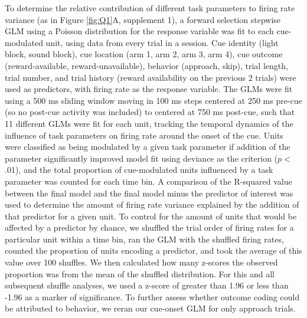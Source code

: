 \documentclass[11pt]{article}
\begin{document}
To determine the relative contribution of different task parameters to firing rate variance (as in Figure \ref{fig:Q1}A, supplement 1), a forward selection stepwise GLM using a Poisson distribution for the response variable was fit to each cue-modulated unit, using data from every trial in a session. Cue identity (light block, sound block), cue location (arm 1, arm 2, arm 3, arm 4), cue outcome (reward-available, reward-unavailable), behavior (approach, skip), trial length, trial number, and trial history (reward availability on the previous 2 trials) were used as predictors, with firing rate as the response variable. The GLMs were fit using a 500 ms sliding window moving in 100 ms steps centered at 250 ms pre-cue (so no post-cue activity was included) to centered at 750 ms post-cue, such that 11 different GLMs were fit for each unit, tracking the temporal dynamics of the influence of task parameters on firing rate around the onset of the cue. Units were classified as being modulated by a given task parameter if addition of the parameter significantly improved model fit using deviance as the criterion ($p <$ .01), and the total proportion of cue-modulated units influenced by a task parameter was counted for each time bin. A comparison of the R-squared value between the final model and the final model minus the predictor of interest was used to determine the amount of firing rate variance explained by the addition of that predictor for a given unit. To control for the amount of units that would be affected by a predictor by chance, we shuffled the trial order of firing rates for a particular unit within a time bin, ran the GLM with the shuffled firing rates, counted the proportion of units encoding a predictor, and took the average of this value over 100 shuffles. We then calculated how many z-scores the observed proportion was from the mean of the shuffled distribution. For this and all subsequent shuffle analyses, we used a z-score of greater than 1.96 or less than -1.96 as a marker of significance. To further assess whether outcome coding could be attributed to behavior, we reran our cue-onset GLM for only approach trials.
\end{document}
